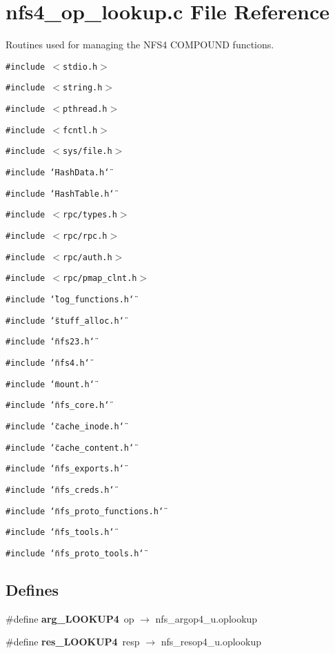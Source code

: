 \section{nfs4\_\-op\_\-lookup.c File Reference}
\label{nfs4__op__lookup_8c}
Routines used for managing the NFS4 COMPOUND functions. 

{\tt \#include $<$stdio.h$>$}\par
{\tt \#include $<$string.h$>$}\par
{\tt \#include $<$pthread.h$>$}\par
{\tt \#include $<$fcntl.h$>$}\par
{\tt \#include $<$sys/file.h$>$}\par
{\tt \#include \char`\"{}Hash\-Data.h\char`\"{}}\par
{\tt \#include \char`\"{}Hash\-Table.h\char`\"{}}\par
{\tt \#include $<$rpc/types.h$>$}\par
{\tt \#include $<$rpc/rpc.h$>$}\par
{\tt \#include $<$rpc/auth.h$>$}\par
{\tt \#include $<$rpc/pmap\_\-clnt.h$>$}\par
{\tt \#include \char`\"{}log\_\-functions.h\char`\"{}}\par
{\tt \#include \char`\"{}stuff\_\-alloc.h\char`\"{}}\par
{\tt \#include \char`\"{}nfs23.h\char`\"{}}\par
{\tt \#include \char`\"{}nfs4.h\char`\"{}}\par
{\tt \#include \char`\"{}mount.h\char`\"{}}\par
{\tt \#include \char`\"{}nfs\_\-core.h\char`\"{}}\par
{\tt \#include \char`\"{}cache\_\-inode.h\char`\"{}}\par
{\tt \#include \char`\"{}cache\_\-content.h\char`\"{}}\par
{\tt \#include \char`\"{}nfs\_\-exports.h\char`\"{}}\par
{\tt \#include \char`\"{}nfs\_\-creds.h\char`\"{}}\par
{\tt \#include \char`\"{}nfs\_\-proto\_\-functions.h\char`\"{}}\par
{\tt \#include \char`\"{}nfs\_\-tools.h\char`\"{}}\par
{\tt \#include \char`\"{}nfs\_\-proto\_\-tools.h\char`\"{}}\par
\subsection*{Defines}
\begin{CompactItemize}
\item 
\#define {\bf arg\_\-LOOKUP4}\ op $\rightarrow$ nfs\_\-argop4\_\-u.oplookup
\item 
\#define {\bf res\_\-LOOKUP4}\ resp $\rightarrow$ nfs\_\-resop4\_\-u.oplookup
\end{CompactItemize}
